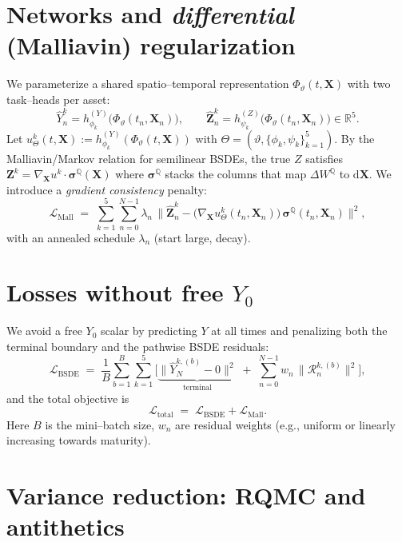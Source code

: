 \documentclass[11pt]{article}
\newcommand{\1}{\mathbbm{1}}
\newcommand{\R}{\mathbb{R}}
\newcommand{\dd}{\mathrm{d}}
\newcommand{\dwt}{\Delta W^{\mathbb{Q}}}
\newcommand{\wh}{\widehat}
\newcommand{\bs}{\boldsymbol}
\begin{document}
\section{Networks and \emph{differential} (Malliavin) regularization}\label{sec:diff-regularization}
We parameterize a shared spatio--temporal representation \(\Phi_\vartheta(t,\bs X)\) with two task--heads per asset:
\[
  \wh Y^k_n = h^{(Y)}_{\phi_k}\!\big(\Phi_\vartheta(t_n,\bs X_n)\big),
  \qquad
  \wh{\bs Z}^k_n = h^{(Z)}_{\psi_k}\!\big(\Phi_\vartheta(t_n,\bs X_n)\big)\in\R^5.
\]
Let \(u^k_{\Theta}(t,\bs X):=h^{(Y)}_{\phi_k}(\Phi_\vartheta(t,\bs X))\) with \(\Theta=(\vartheta,\{\phi_k,\psi_k\}_{k=1}^5)\).
By the Malliavin/Markov relation for semilinear BSDEs, the true \(Z\) satisfies 
\(
  \bs Z^{k} = \nabla_{\bs X} u^k\cdot \bs\sigma^{\mathbb{Q}}(\bs X)
\)
where \(\bs\sigma^{\mathbb{Q}}\) stacks the columns that map \(\dwt\) to \(\dd \bs X\). We introduce a \emph{gradient consistency} penalty:
\begin{equation}\label{eq:malliavin-penalty}
  \mathcal{L}_{\mathrm{Mall}} 
  \;=\; \sum_{k=1}^5 \sum_{n=0}^{N-1} 
  \lambda_n \,\Big\lVert \wh{\bs Z}^k_n 
  - \Big(\nabla_{\bs X} u^k_{\Theta}(t_n,\bs X_n)\Big)\, \bs\sigma^{\mathbb{Q}}(t_n,\bs X_n) \Big\rVert^2,
\end{equation}
with an annealed schedule \(\lambda_n\) (start large, decay).

\section{Losses without free \(Y_0\)}
We avoid a free \(Y_0\) scalar by predicting \(Y\) at all times and penalizing both the terminal boundary and the pathwise BSDE residuals:
\begin{equation}\label{eq:loss}
  \mathcal{L}_{\mathrm{BSDE}}
  \;=\; \frac{1}{B}\sum_{b=1}^B \sum_{k=1}^5 
  \Bigg[
    \underbrace{\big\lVert \wh Y^{k,(b)}_N - 0 \big\rVert^2}_{\text{terminal}}
    \;+\;
    \sum_{n=0}^{N-1} w_n \,\big\lVert \mathcal{R}^{k,(b)}_n \big\rVert^2
  \Bigg],
\end{equation}
and the total objective is
\begin{equation}\label{eq:total-loss}
  \mathcal{L}_{\text{total}} \;=\; \mathcal{L}_{\mathrm{BSDE}} + \mathcal{L}_{\mathrm{Mall}}.
\end{equation}
Here \(B\) is the mini--batch size, \(w_n\) are residual weights (e.g., uniform or linearly increasing towards maturity).

\section{Variance reduction: RQMC and antithetics}\label{sec:variance}
\end{document}
